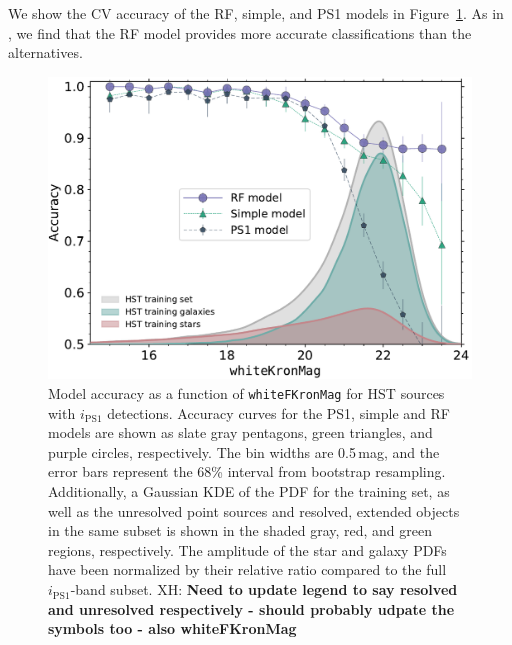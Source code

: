 \documentclass[twocolumn]{aastex63}
\newcommand{\xander}[1]{{\color{red} XH: \textbf{#1}}}
\begin{document}


We show the CV accuracy of the RF, simple, and PS1 models in
Figure~\ref{fig:hst_acc}. As in \citet{Tachibana18}, we find that the RF
model provides more accurate classifications than the alternatives.

\begin{figure}[t]
 \centering
  \includegraphics[width=\columnwidth]{./Figures/CV_Accuracy_FHST.pdf}
  \caption{Model accuracy as a function of \texttt{whiteFKronMag} for HST
  sources with $i_\mathrm{PS1}$ detections. Accuracy curves for the PS1,
  simple and RF models are shown as slate gray pentagons, green triangles, and
  purple circles, respectively. The bin widths are 0.5\,mag, and the error
  bars represent the 68\% interval from bootstrap resampling. Additionally, a
  Gaussian KDE of the PDF for the training set, as well as the unresolved
  point sources and resolved, extended objects in the same subset is shown in
  the shaded gray, red, and green regions, respectively. The amplitude of the
  star and galaxy PDFs have been normalized by their relative ratio compared
  to the full $i_\mathrm{PS1}$-band subset. \xander{Need to update legend to
  say resolved and unresolved respectively - should probably udpate the
  symbols too - also whiteFKronMag}}
  \label{fig:hst_acc}
\end{figure}  
\end{document}
